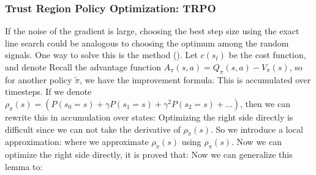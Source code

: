 \documentclass[10pt]{report}
\begin{document}
\subsubsection{Trust Region Policy Optimization: TRPO}
If the noise of the gradient is large, choosing the best step size using the exact line search could be analogous to choosing the optimum among the random signals.
One way to solve this is the  method (\cite{schulman2015trust}). Let $c(s_t)$ be the cost function, and denote
Recall the advantage function $A_\pi(s,a)=Q_\pi(s,a)-V_\pi(s)$, so for another policy $\tilde{\pi}$, we have the improvement formula:
This is accumulated over timesteps. If we denote $\rho_{\pi}(s)=(P(s_0=s)+\gamma P(s_1=s)+\gamma^2P(s_2=s)+\ldots)$, then we can rewrite this in accumulation over states:
Optimizing the right side directly is difficult since we can not take the derivative of $\rho_{\tilde{\pi}}(s)$. So we introduce a local approximation:
where we approximate $\rho_{\tilde{\pi}}(s)$ using $\rho_{\pi}(s)$. Now we can optimize the right side directly, it is proved that:
Now we can generalize this lemma to:
\end{document}

